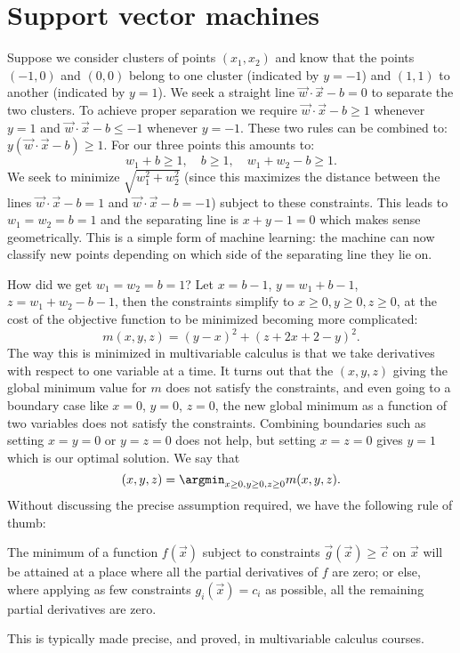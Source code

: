 \section{Support vector machines}
	Suppose we consider clusters of points $(x_1,x_2)$ and know that the points $(-1,0)$ and $(0,0)$ belong to one cluster (indicated by $y=-1$) and $(1,1)$ to another (indicated by $y=1$).
	We seek a straight line $\vec w\cdot\vec x-b=0$ to separate the two clusters.
	To achieve proper separation we require $\vec w\cdot\vec x-b\ge 1$ whenever $y=1$ and
	$\vec w\cdot\vec x-b\le -1$ whenever $y=-1$.
	These two rules can be combined to: $y(\vec w\cdot\vec x-b)\ge 1$.
	For our three points this amounts to:
	\[
	w_1+b\ge 1,\quad b\ge 1,\quad w_1+w_2-b\ge 1.
	\]
	We seek to minimize $\sqrt{w_1^2+w_2^2}$ (since this maximizes the distance between the lines $\vec w\cdot\vec x-b= 1$ and $\vec w\cdot\vec x-b= -1$) subject to these constraints. This leads to $w_1=w_2=b=1$ and the separating line is $x+y-1=0$ which makes sense geometrically. This is a simple form of machine learning: the machine can now classify new points depending on which side of the separating line they lie on.


	How did we get $w_1=w_2=b=1$? Let $x=b-1$, $y=w_1+b-1$, $z=w_1+w_2-b-1$, then the constraints simplify to $x\ge 0, y\ge 0, z\ge 0$, at the cost of the objective function to be minimized becoming more complicated:
	\[
		m(x,y,z)=(y-x)^2+(z+2x+2-y)^2.
	\]
	The way this is minimized in multivariable calculus is that we take derivatives with respect to one variable at a time. It turns out that the $(x,y,z)$ giving the global minimum value for $m$  does not satisfy the constraints, and even going to a boundary case like $x=0$, $y=0$, $z=0$, the new global minimum as a function of two variables does not satisfy the constraints. Combining boundaries such as setting $x=y=0$ or $y=z=0$ does not help, but setting $x=z=0$ gives $y=1$ which is our optimal solution.
	We say that
	\[
		(x,y,z) = \argmin_{x\ge 0, y\ge 0, z\ge 0} m(x,y,z).
	\]
	Without discussing the precise assumption required, we have the following rule of thumb:
	\begin{thm}
	The minimum of a function $f(\vec x)$ subject to constraints $\vec g(\vec x)\ge\vec c$ on $\vec x$ will be attained at a place where all the partial derivatives of $f$ are zero; or else, where applying as few constraints $g_i(\vec x)=c_i$ as possible, all the remaining partial derivatives are zero.
	\end{thm}
	This is typically made precise, and proved, in multivariable calculus courses.

